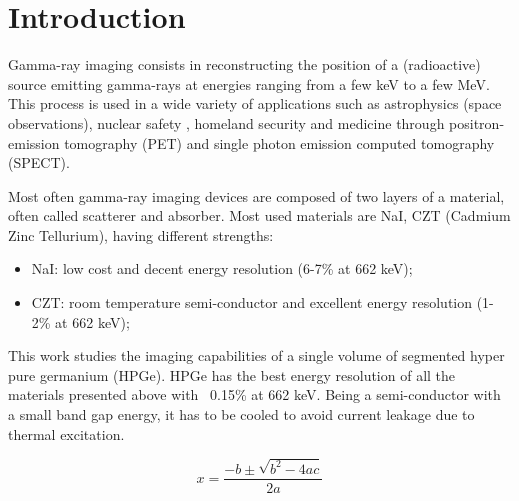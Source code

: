\chapter*{Introduction}

Gamma-ray imaging consists in reconstructing the position of a (radioactive) source emitting gamma-rays
at energies ranging from a few keV to a few MeV. This process is used in a wide variety of applications such 
as astrophysics (space observations), nuclear safety \cite{Gagliardi2024NovelAO}, homeland security and medicine through positron-emission tomography (PET)
and single photon emission computed tomography (SPECT).

Most often gamma-ray imaging devices are composed of two layers of a material, often called scatterer and absorber. Most used 
materials are NaI, CZT (Cadmium Zinc Tellurium), having different strengths:
\begin{itemize}
    \item NaI\@: low cost and decent energy resolution (6-7\% at 662 keV);
    \item CZT\@: room temperature semi-conductor and excellent energy resolution (1-2\% at 662 keV);
\end{itemize}

This work studies the imaging capabilities of a single volume of segmented hyper pure germanium (HPGe). HPGe has
the best energy resolution of all the materials presented above with ~0.15\% at 662 keV. Being a semi-conductor with a small
band gap energy, it has to be cooled to avoid current leakage due to thermal excitation.

\[ x = \frac{-b \pm \sqrt{b^2 - 4ac}}{2a} \]
